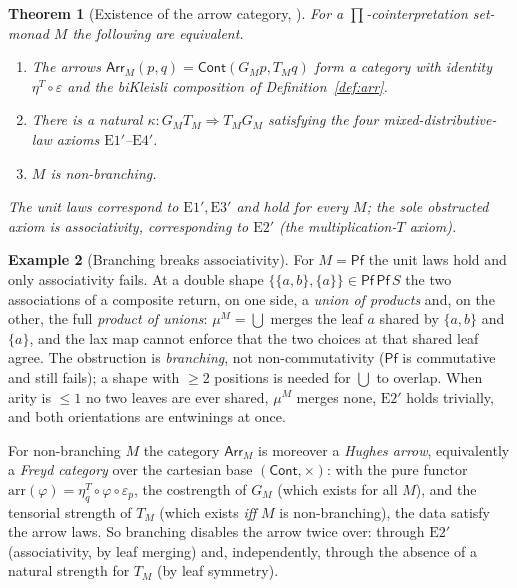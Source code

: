 \documentclass[11pt]{article}
\theoremstyle{plain}
\newtheorem{theorem}{Theorem}
\theoremstyle{definition}
\newtheorem{example}[theorem]{Example}
\theoremstyle{remark}
\newcommand{\Cont}{\mathsf{Cont}}
\newcommand{\Pf}{\mathsf{Pf}}
\newcommand{\Arr}{\mathsf{Arr}}
\begin{document}
\begin{theorem}[Existence of the arrow category, {\cite[effect--coeffect arrows note]{MacBethArrows}}]
\label{thm:kappa}
For a $\prod$-cointerpretation set-monad $M$ the following are equivalent.
\begin{enumerate}
  \item The arrows $\Arr_M(p,q)=\Cont(G_M p,T_M q)$ form a category with identity
  $\eta^T\circ\varepsilon$ and the biKleisli composition of Definition~\ref{def:arr}.
  \item There is a natural $\kappa\colon G_M T_M\Rightarrow T_M G_M$ satisfying the four
  mixed-distributive-law axioms $\mathrm{E}1'$--$\mathrm{E}4'$.
  \item $M$ is non-branching.
\end{enumerate}
The unit laws correspond to $\mathrm{E}1',\mathrm{E}3'$ and hold for every $M$; the sole
obstructed axiom is associativity, corresponding to $\mathrm{E}2'$ (the
multiplication-$T$ axiom).
\end{theorem}

\begin{example}[Branching breaks associativity]\label{ex:pf}
For $M=\Pf$ the unit laws hold and only associativity fails. At a double shape
$\{\{a,b\},\{a\}\}\in\Pf\,\Pf\,S$ the two associations of a composite return, on one
side, a \emph{union of products} and, on the other, the full \emph{product of unions}:
$\mu^M=\bigcup$ merges the leaf $a$ shared by $\{a,b\}$ and $\{a\}$, and the lax map
cannot enforce that the two choices at that shared leaf agree. The obstruction is
\emph{branching}, not non-commutativity ($\Pf$ is commutative and still fails); a shape
with $\ge2$ positions is needed for $\bigcup$ to overlap. When arity is $\le1$ no two
leaves are ever shared, $\mu^M$ merges none, $\mathrm{E}2'$ holds trivially, and both
orientations are entwinings at once.
\end{example}

For non-branching $M$ the category $\Arr_M$ is moreover a \emph{Hughes arrow},
equivalently a \emph{Freyd category} over the cartesian base $(\Cont,\times)$: with the
pure functor $\mathrm{arr}(\varphi)=\eta^T_q\circ\varphi\circ\varepsilon_p$, the
costrength of $G_M$ (which exists for all $M$), and the tensorial strength of $T_M$
(which exists \emph{iff} $M$ is non-branching), the data satisfy the arrow laws. So
branching disables the arrow twice over: through $\mathrm{E}2'$ (associativity, by leaf
merging) and, independently, through the absence of a natural strength for $T_M$ (by leaf
symmetry).
\end{document}
